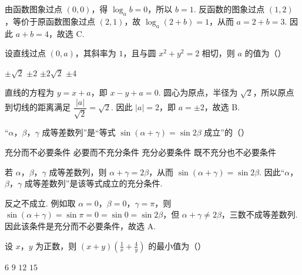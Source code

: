 
\begin{solution}
由函数图象过点 \((0,0)\)，得 \(\log_{a}b=0\)，所以 \(b=1\). 反函数的图象过点 \((1,2)\)，等价于原函数图象过点 \((2,1)\)，故 \(\log_{a}(2+b)=1\)，从而 \(a=2+b=3\). 因此 \(a+b=4\)，故选 C.
\end{solution}

\begin{problem}
设直线过点 \((0, a)\)，其斜率为 \(1\)，且与圆 \(x^{2} + y^{2} = 2\) 相切，则 \(a\) 的值为（\quad）

\choices
    {\(\pm \sqrt{2}\)}
    {\(\pm 2\)}
    {\(\pm 2\sqrt{2}\)}
    {\(\pm 4\)}
\end{problem}


\begin{solution}
直线的方程为 \(y=x+a\)，即 \(x-y+a=0\). 圆心为原点，半径为 \(\sqrt{2}\)，所以原点到切线的距离满足 \(\dfrac{\lvert a\rvert}{\sqrt{2}}=\sqrt{2}\). 因此 \(\lvert a\rvert=2\)，即 \(a=\pm2\)，故选 B.
\end{solution}

\begin{problem}
“\(\alpha\)，\(\beta\)，\(\gamma\) 成等差数列”是“等式 \(\sin (\alpha + \gamma) = \sin 2\beta\) 成立”的（\quad）

\choices
    {充分而不必要条件}
    {必要而不充分条件}
    {充分必要条件}
    {既不充分也不必要条件}
\end{problem}


\begin{solution}
若 \(\alpha\)，\(\beta\)，\(\gamma\) 成等差数列，则 \(\alpha+\gamma=2\beta\)，从而 \(\sin(\alpha+\gamma)=\sin2\beta\). 因此“\(\alpha\)，\(\beta\)，\(\gamma\) 成等差数列”是该等式成立的充分条件.

反之不成立. 例如取 \(\alpha=0\)，\(\beta=0\)，\(\gamma=\pi\)，则 \(\sin(\alpha+\gamma)=\sin\pi=0=\sin0=\sin2\beta\)，但 \(\alpha+\gamma\neq2\beta\)，三数不成等差数列. 因此该条件是充分而不必要条件，故选 A.
\end{solution}

\begin{problem}
设 \(x\)，\(y\) 为正数，则 \((x + y)\left(\frac{1}{x} + \frac{4}{y}\right)\) 的最小值为（\quad）

\choices
    {\(6\)}
    {\(9\)}
    {\(12\)}
    {\(15\)}
\end{problem}


